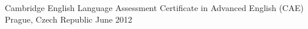 \begin{cventries}
  \cventry
    {Cambridge English Language Assessment}
    {Certificate in Advanced English (CAE)}
    {Prague, Czech Republic}
    {June 2012}
    {}
\end{cventries}
